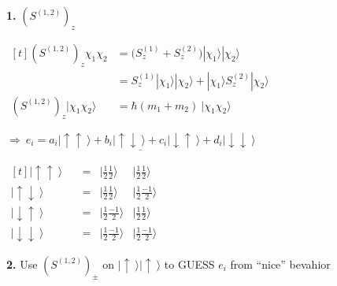 \documentclass[12pt]{article}
\begin{document}
%
%
%
\newpage 
\noindent
\textbf{1.} \(\left( S^{(1,2)} \right)_z\) \\[10pt]
\begin{minipage}[t]{.55\textwidth}
    \( \begin{aligned}[t] 
        \left( S^{(1,2)} \right)_z \chi_1 \chi_2 & = \Big( S^{(1)}_z + S^{(2)}_z \Big) | \chi_1 \rangle | \chi_2 \rangle
            \\[10pt]
        & = S^{(1)}_z | \chi_1 \rangle | \chi_2 \rangle 
            + | \chi_1 \rangle S^{(2)}_z | \chi_2 \rangle \\[10pt]
        \left( S^{(1,2)} \right)_z  | \chi_1 \chi_2 \rangle 
            & = \hbar (m_1 + m_2) \ | \chi_1 \chi_2 \rangle
    \end{aligned} \)
    
    \vspace{10pt}
    \( \Rightarrow \ \underline{ e_i = a_i| \uparrow \uparrow \ \rangle + b_i| \uparrow \downarrow \ \rangle +
    c_i| \downarrow \uparrow \ \rangle + d_i| \downarrow \downarrow \ \rangle } \)    
\end{minipage}
\hfill\vline\hfill
\begin{minipage}[t]{.3\textwidth}
    \( \begin{aligned}[t]
        | \uparrow \uparrow \ \rangle \quad & =
            & | \tfrac{1}{2} \tfrac{1}{2} \rangle 
            &  | \tfrac{1}{2} \tfrac{1}{2} \rangle 
            \\[10pt]
        | \uparrow \downarrow \ \rangle \quad & =
            & | \tfrac{1}{2} \tfrac{1}{2} \rangle 
            &  | \tfrac{1}{2} \tfrac{-1}{2} \rangle 
            \\[10pt]
        | \downarrow \uparrow \ \rangle \quad & =
            & | \tfrac{1}{2} \tfrac{-1}{2} \rangle 
            &  | \tfrac{1}{2} \tfrac{1}{2} \rangle 
            \\[10pt]
        | \downarrow \downarrow \ \rangle \quad & =
            & | \tfrac{1}{2} \tfrac{-1}{2} \rangle 
            &  | \tfrac{1}{2} \tfrac{-1}{2} \rangle
    \end{aligned}  \)
\end{minipage}

\vspace{25pt} \noindent
\textbf{2.} Use \( \left( S^{ (1,2) } \right)_\pm \) on 
    \( | \uparrow \ \rangle | \uparrow \ \rangle \) to GUESS \(e_i\) from ``nice'' bevahior 
\end{document}
